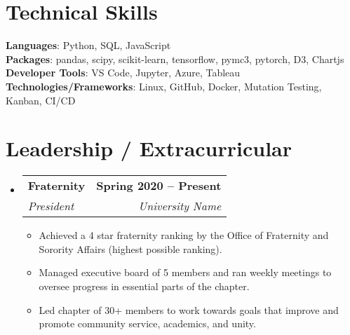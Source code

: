 \documentclass[letterpaper,11pt]{article}
\makeatletter
\newcommand{\resumeItem}[1]{
  \item\small{
    {#1 \vspace{-2pt}}
  }
}
\newcommand{\resumeSubheading}[4]{
  \vspace{-2pt}\item
    \begin{tabular*}{1.0\textwidth}[t]{l@{\extracolsep{\fill}}r}
      \textbf{#1} & \textbf{\small #2} \\
      \textit{\small#3} & \textit{\small #4} \\
    \end{tabular*}\vspace{-7pt}
}
\newcommand{\resumeSubHeadingListStart}{\begin{itemize}[leftmargin=0.0in, label={}]}
\newcommand{\resumeSubHeadingListEnd}{\end{itemize}}
\newcommand{\resumeItemListStart}{\begin{itemize}}
\newcommand{\resumeItemListEnd}{\end{itemize}\vspace{-5pt}}
\makeatother
\begin{document}
\section{Technical Skills}
 \begin{itemize}[leftmargin=0.15in, label={}]
    \small{\item{
     \textbf{Languages}{: Python, SQL, JavaScript} \\
     \textbf{Packages}{: pandas, scipy, scikit-learn, tensorflow, pymc3, pytorch, D3, Chartjs} \\
     \textbf{Developer Tools}{: VS Code, Jupyter, Azure, Tableau} \\
     \textbf{Technologies/Frameworks}{: Linux, GitHub, Docker, Mutation Testing, Kanban, CI/CD} \\
    }}
 \end{itemize}
 \vspace{-16pt}


\section{Leadership / Extracurricular}
    \resumeSubHeadingListStart
        \resumeSubheading{Fraternity}{Spring 2020 -- Present}{President}{University Name}
            \resumeItemListStart
                \resumeItem{Achieved a 4 star fraternity ranking by the Office of Fraternity and Sorority Affairs (highest possible ranking).}
                \resumeItem{Managed executive board of 5 members and ran weekly meetings to oversee progress in essential parts of the chapter.}
                \resumeItem{Led chapter of 30+ members to work towards goals that improve and promote community service, academics, and unity.}
            \resumeItemListEnd
        
    \resumeSubHeadingListEnd
\end{document}
